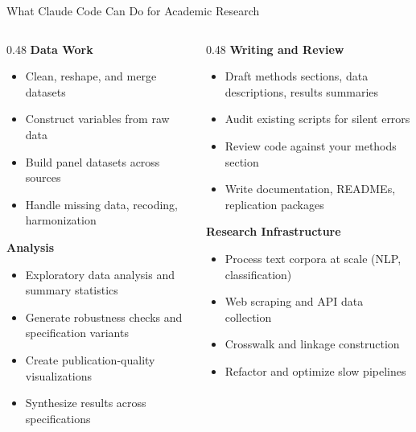 \documentclass[aspectratio=169, 11pt]{beamer}
\begin{document}
\begin{frame}{What Claude Code Can Do for Academic Research}
  \footnotesize
  \begin{columns}[T]
    \begin{column}{0.48\textwidth}
      \textbf{Data Work}
      \begin{itemize}
        \item Clean, reshape, and merge datasets
        \item Construct variables from raw data
        \item Build panel datasets across sources
        \item Handle missing data, recoding, harmonization
      \end{itemize}

      \vspace{0.5em}
      \textbf{Analysis}
      \begin{itemize}
        \item Exploratory data analysis and summary statistics
        \item Generate robustness checks and specification variants
        \item Create publication-quality visualizations
        \item Synthesize results across specifications
      \end{itemize}
    \end{column}
    \begin{column}{0.48\textwidth}
      \textbf{Writing and Review}
      \begin{itemize}
        \item Draft methods sections, data descriptions, results summaries
        \item Audit existing scripts for silent errors
        \item Review code against your methods section
        \item Write documentation, READMEs, replication packages
      \end{itemize}

      \vspace{0.5em}
      \textbf{Research Infrastructure}
      \begin{itemize}
        \item Process text corpora at scale (NLP, classification)
        \item Web scraping and API data collection
        \item Crosswalk and linkage construction
        \item Refactor and optimize slow pipelines
      \end{itemize}
    \end{column}
  \end{columns}
\end{frame}
\end{document}
